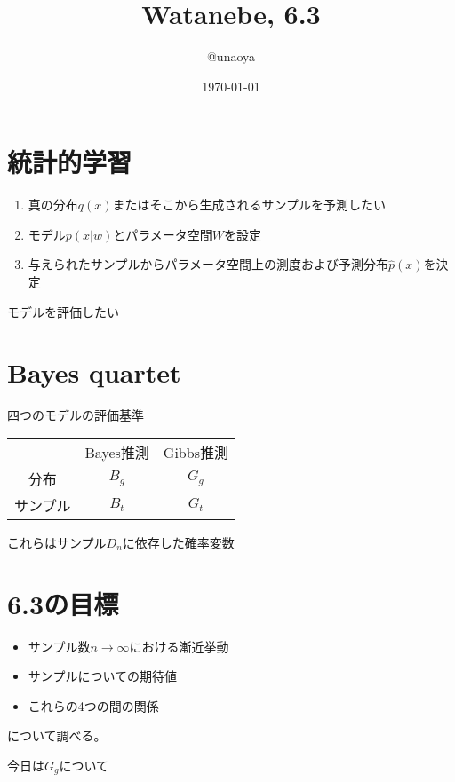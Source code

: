 \documentclass[uplatex, slide, papersize]{jsarticle}
\title{Watanebe, 6.3}
\date{\today}
\author{@unaoya}
\begin{document}
\maketitle

\section*{統計的学習}
\begin{enumerate}
\item 真の分布$q(x)$またはそこから生成されるサンプルを予測したい
\item モデル$p(x\vert w)$とパラメータ空間$W$を設定
\item 与えられたサンプルからパラメータ空間上の測度および予測分布$\hat{p}(x)$を決定
\end{enumerate}

\begin{center}
\Large{モデルを評価したい}
\end{center}

\section*{Bayes quartet}
四つのモデルの評価基準

\begin{table}[!h]
\begin{tabular}{ccc}
&Bayes推測&Gibbs推測\\
分布&$B_g$&$G_g$\\
サンプル&$B_t$&$G_t$
\end{tabular}
\end{table}

これらはサンプル$D_n$に依存した確率変数

\section*{6.3の目標}
\begin{itemize}
\item サンプル数$n\to\infty$における漸近挙動
\item サンプルについての期待値
\item これらの4つの間の関係
\end{itemize}
について調べる。

\newpage
{}
\begin{center}
\huge{今日は$G_g$について}
\end{center}
\newpage
\end{document}
